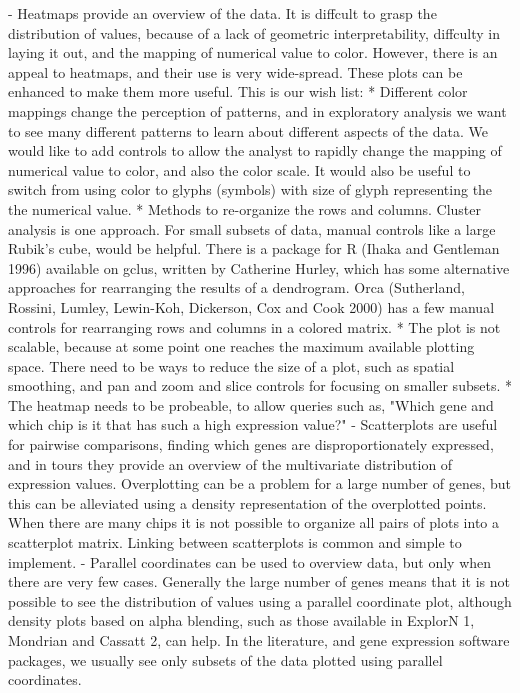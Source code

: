 \documentclass[11pt,a4paper,oldfontcommands,openany]{memoir}
\numberwithin{equation}{section} %
\begin{document}
- Heatmaps provide an overview of the data. It is diffcult to grasp the distribution of values, because of a lack of geometric interpretability, diffculty in laying it out, and the mapping of numerical value to color. However, there is an appeal to heatmaps, and their use is very wide-spread. These plots can be enhanced to make them more useful. This is our wish list:
* Different color mappings change the perception of patterns, and in exploratory analysis we want to see many different patterns to learn about different aspects of the data. We would like to add controls to allow the analyst to rapidly change the mapping of numerical value to color, and also the color scale. It would also be useful to switch from using color to glyphs (symbols) with size of glyph representing the the numerical value.
* Methods to re-organize the rows and columns. Cluster analysis is one approach. For small subsets of data, manual controls like a large Rubik's cube, would be helpful. There is a package for R (Ihaka and Gentleman 1996) available on gclus, written by Catherine Hurley, which has some alternative approaches for rearranging the results of a dendrogram. Orca (Sutherland, Rossini, Lumley, Lewin-Koh, Dickerson, Cox and Cook 2000) has a few manual controls for rearranging rows and columns in a colored matrix.
* The plot is not scalable, because at some point one reaches the maximum available plotting space. There need to be ways to reduce the size of a plot, such as spatial smoothing, and pan and zoom and slice controls for focusing on smaller subsets.
* The heatmap needs to be probeable, to allow queries such as, "Which gene and which chip is it that has such a high expression value?"
- Scatterplots are useful for pairwise comparisons, finding which genes are disproportionately expressed, and in tours they provide an overview of the multivariate distribution of expression values. Overplotting can be a problem for a large number of genes, but this can be alleviated using a density representation of the overplotted points. When there are many chips it is not possible to organize all pairs of plots into a scatterplot matrix. Linking between scatterplots is common and simple to implement.
- Parallel coordinates can be used to overview data, but only when there are very few cases. Generally the large number of genes means that it is not possible to see the distribution of values using a parallel coordinate plot, although density plots based on alpha blending, such as those available in ExplorN 1, Mondrian and Cassatt 2, can help. In the literature, and gene expression software packages, we usually see only subsets of the data plotted using parallel coordinates.
\end{document}
